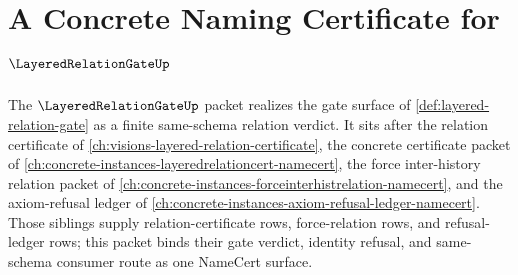 \chapter{A Concrete Naming Certificate for $\LayeredRelationGateUp$}
\label{ch:concrete-instances-layered-relation-gate-namecert}

The $\LayeredRelationGateUp$ packet realizes the gate surface of \autoref{def:layered-relation-gate} as a finite same-schema relation verdict. It sits after the relation certificate of \autoref{ch:visions-layered-relation-certificate}, the concrete certificate packet of \autoref{ch:concrete-instances-layeredrelationcert-namecert}, the force inter-history relation packet of \autoref{ch:concrete-instances-forceinterhistrelation-namecert}, and the axiom-refusal ledger of \autoref{ch:concrete-instances-axiom-refusal-ledger-namecert}. Those siblings supply relation-certificate rows, force-relation rows, and refusal-ledger rows; this packet binds their gate verdict, identity refusal, and same-schema consumer route as one NameCert surface.



